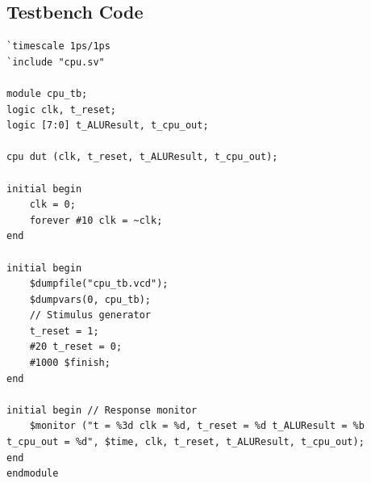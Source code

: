 \documentclass{article}
\begin{document}
\subsection{Testbench Code}
\begin{lstlisting}
`timescale 1ps/1ps
`include "cpu.sv"

module cpu_tb;
logic clk, t_reset;
logic [7:0] t_ALUResult, t_cpu_out;

cpu dut (clk, t_reset, t_ALUResult, t_cpu_out);

initial begin
    clk = 0;
    forever #10 clk = ~clk;
end

initial begin
    $dumpfile("cpu_tb.vcd"); 
    $dumpvars(0, cpu_tb);
    // Stimulus generator
    t_reset = 1; 
    #20 t_reset = 0;
    #1000 $finish;
end

initial begin // Response monitor
    $monitor ("t = %3d clk = %d, t_reset = %d t_ALUResult = %b t_cpu_out = %d", $time, clk, t_reset, t_ALUResult, t_cpu_out);
end
endmodule
\end{lstlisting}
\end{document}
